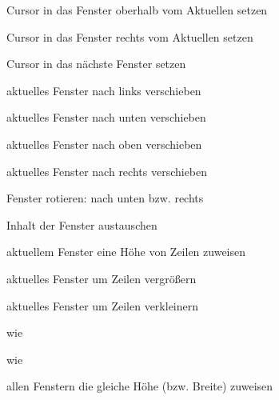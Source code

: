 \documentclass
[
  draft    = true,
  fontsize = 11pt,
  parskip  = half,
  BCOR     = 0pt,
  DIV      = calc,
  ngerman
]
{scrartcl}
\begin{document}
\begin{mytemize}
  \item {}       Cursor in das Fenster oberhalb vom Aktuellen setzen
  \item {}       Cursor in das Fenster rechts vom Aktuellen setzen
  \item {}     Cursor in das  nächste Fenster setzen
  \item {}     aktuelles Fenster nach links verschieben
  \item {}     aktuelles Fenster nach unten verschieben
  \item {}     aktuelles Fenster nach oben verschieben
  \item {}     aktuelles Fenster nach rechts verschieben
  \item {}     Fenster rotieren: nach unten bzw. rechts
  \item {}     Inhalt der Fenster austauschen
  \item {}    aktuellem Fenster eine Höhe von  Zeilen zuweisen
  \item {} aktuelles Fenster um  Zeilen vergrößern
  \item {} aktuelles Fenster um  Zeilen verkleinern
  \item {}     wie ~
  \item {}     wie ~
  \item {}     allen Fenstern die gleiche Höhe (bzw. Breite) zuweisen
\end{mytemize}

\end{document}

